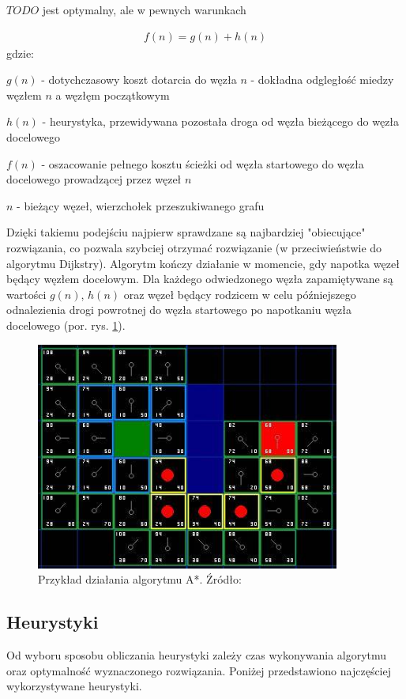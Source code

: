 $TODO$ jest optymalny, ale w pewnych warunkach

\begin{gather}
 	f(n) = g(n) + h(n)
 	\label{eq_astar} 
\end{gather}
 gdzie:

 $g(n)$ - dotychczasowy koszt dotarcia do węzła $n$ - dokładna odgległość miedzy węzłem $n$ a węzłęm początkowym

 $h(n)$ - heurystyka, przewidywana pozostała droga od węzła bieżącego do węzła docelowego

 $f(n)$ - oszacowanie pełnego kosztu ścieżki od węzła startowego do węzła docelowego prowadzącej przez węzeł $n$

 $n$ - bieżący węzeł, wierzchołek przeszukiwanego grafu

Dzięki takiemu podejściu najpierw sprawdzane są najbardziej "obiecujące" rozwiązania, co pozwala szybciej otrzymać rozwiązanie (w przeciwieństwie do algorytmu Dijkstry).
Algorytm kończy działanie w momencie, gdy napotka węzeł będący węzłem docelowym.
Dla każdego odwiedzonego węzła zapamiętywane są wartości $g(n)$, $h(n)$ oraz węzeł będący rodzicem w celu późniejszego odnalezienia drogi powrotnej do węzła startowego po napotkaniu węzła docelowego (por. rys. \ref{fig:image_astar2}).

\begin{figure}[H]
	\centering
	\includegraphics[width=10cm]{img/astar-t7}
	\caption{Przykład działania algorytmu A*. Źródło: \cite{astar2}}
	\label{fig:image_astar2}
\end{figure}

\subsection{Heurystyki}
Od wyboru sposobu obliczania heurystyki zależy czas wykonywania algorytmu oraz optymalność wyznaczonego rozwiązania.
Poniżej przedstawiono najczęściej wykorzystywane heurystyki.

